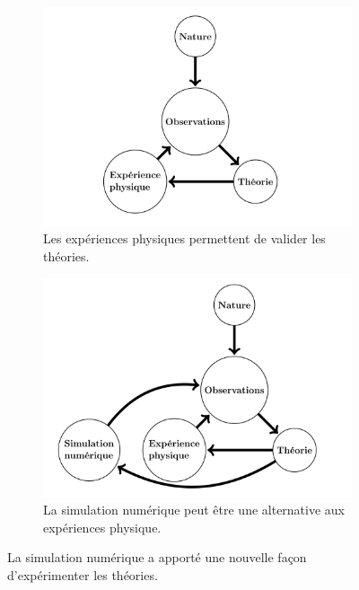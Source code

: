     
    \begin{figure}[t!]
        \centering
        \begin{subfigure}[t]{0.48\textwidth}
            \centering
            \includegraphics[width=\linewidth]{images/edl_simu_old.png}
            \caption{\label{fig:edl_simu_old}Les expériences physiques permettent de valider les théories.}
        \end{subfigure}\hfill
        \begin{subfigure}[t]{0.48\textwidth}
            \centering
            \includegraphics[width=\linewidth]{images/edl_simu_new.png}
            \caption{\label{fig:edl_simu_new}La simulation numérique peut être une alternative aux expériences physique.}
        \end{subfigure}
        \caption{La simulation numérique a apporté une nouvelle façon d'expérimenter les théories.}
        \label{fig:tikz_simulation}
    \end{figure}
    

